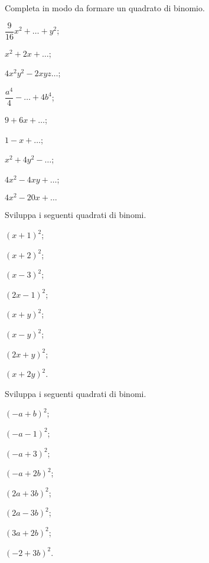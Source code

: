 \begin{esercizio}
 \label{ese:11.3}
Completa in modo da formare un quadrato di binomio.
\begin{multicols}{3}
\begin{enumeratea}
\spazielenx
 \item $\dfrac{9}{16}x^{2}+\ldots +y^{2}$;
 \item $x^{2} + 2x + \ldots $;
 \item $4x^{2}y^{2} - 2xyz \ldots $;
 \item $\dfrac{a^{4}}{4}-\ldots+4b^{4}$;
 \item $9+6x+ \ldots $;
 \item $1-x+ \ldots $;
 \item $x^{2}+4y^{2}-\ldots $;
 \item $4x^{2}-4{xy}+ \ldots $;
 \item $4x^{2}-20x+\ldots $
\end{enumeratea}
\end{multicols}
\end{esercizio}


\begin{esercizio}
 \label{ese:11.4}
Sviluppa i seguenti quadrati di binomi.
\begin{multicols}{4}
\begin{enumeratea}
 \item $\left(x+1\right)^{2}$;
 \item $\left(x+2\right)^{2}$;
 \item $\left(x-3\right)^{2}$;
 \item $\left(2x-1\right)^{2}$;
 \item $\left(x+y\right)^{2}$;
 \item $\left(x-y\right)^{2}$;
 \item $\left(2x+y\right)^{2}$;
 \item $\left(x+2y\right)^{2}$.
\end{enumeratea}
\end{multicols}
\end{esercizio}

\begin{esercizio}
 \label{ese:11.5}
Sviluppa i seguenti quadrati di binomi.
\begin{multicols}{4}
\begin{enumeratea}
 \item $\left(-a+b\right)^{2}$;
 \item $\left(-a-1\right)^{2}$;
 \item $\left(-a+3\right)^{2}$;
 \item $\left(-a+2b\right)^{2}$;
 \item $\left(2a+3b\right)^{2}$;
 \item $\left(2a-3b\right)^{2}$;
 \item $\left(3a+2b\right)^{2}$;
 \item $\left(-2+3b\right)^{2}$.
\end{enumeratea}
\end{multicols}
\end{esercizio}

